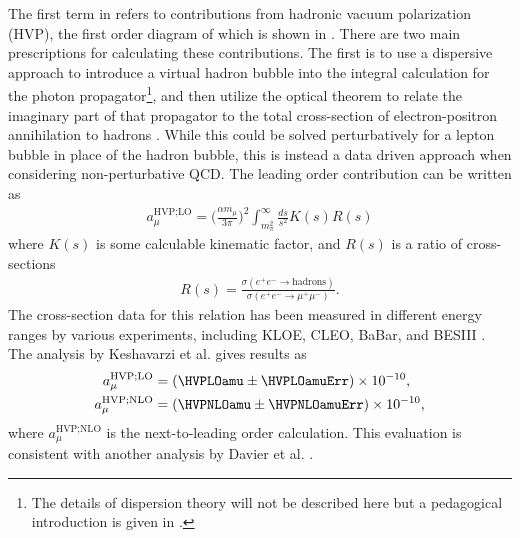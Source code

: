The first term in  refers to contributions from hadronic vacuum polarization (HVP), the first order diagram of which is shown in . There are two main prescriptions for calculating these contributions. The first is to use a dispersive approach to introduce a virtual hadron bubble into the integral calculation for the photon propagator\footnote{The details of dispersion theory will not be described here but a pedagogical introduction is given in .}, and then utilize the optical theorem to relate the imaginary part of that propagator to the total cross-section of electron-positron annihilation to hadrons \cite{Jeger}. While this could be solved perturbatively for a lepton bubble in place of the hadron bubble, this is instead a data driven approach when considering non-perturbative QCD. The leading order contribution can be written as 
		\begin{align}
            a_{\mu}^{\text{HVP;LO}} = \Big(\frac{\alpha m_{\mu}}{3\pi}\Big)^{2} \int_{m_{\pi}^{2}}^{\infty} \frac{ds}{s^{2}} K(s) R(s)
		\end{align}
where $K(s)$ is some calculable kinematic factor, and $R(s)$ is a ratio of cross-sections
		\begin{align}
            R(s) = \frac{\sigma(e^{+}e^{-} \rightarrow \text{hadrons})}{\sigma(e^{+}e^{-} \rightarrow \mu^{+}\mu^{-})}.
		\end{align}
The cross-section data for this relation has been measured in different energy ranges by various experiments, including KLOE, CLEO, BaBar, and BESIII \cite{KLOE,CLEO,BaBar,BESIII}. The analysis by Keshavarzi et al. \cite{Keshavarzi:2018mgv} gives results as 
		\begin{equation}
		\begin{aligned}
            a_{\mu}^{\text{HVP;LO}} &= (\HVPLOamu \pm \HVPLOamuErr) \times 10^{-10}, \\
            a_{\mu}^{\text{HVP;NLO}} &= (\HVPNLOamu \pm \HVPNLOamuErr) \times 10^{-10}, 
		\end{aligned}
		\end{equation}
where $a_{\mu}^{\text{HVP;NLO}}$ is the next-to-leading order calculation. This evaluation is consistent with another analysis by Davier et al. \cite{HVP2}.

